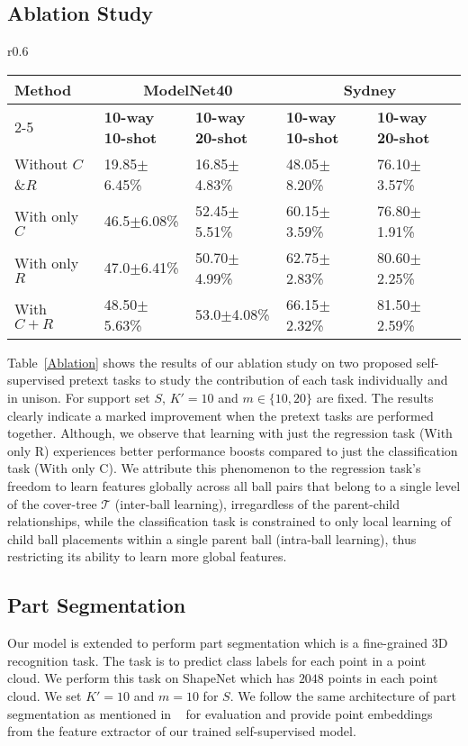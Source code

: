 \documentclass{article}
\newcommand{\mT}{\mathcal{T}}
\begin{document}
\subsection{Ablation Study}
\begin{wraptable}{r}{0.6\linewidth}
	\caption{Ablation study (accuracy \%) on ModelNet40 and Sydney datasets for DGCNN with random init (without $C$/ $R$) and pre-trained with our self-supervised tasks $C$ and $R$.}
	\label{Ablation}
	\centering
	\tiny
	\setlength{\tabcolsep}{4.5pt}
	\begin{tabular}{lllll}
		\toprule
		Method & \multicolumn{2}{c}{ModelNet40}  &  \multicolumn{2}{c}{Sydney}\\
		\cmidrule(r){2-5}
		& \textbf{10-way 10-shot} & \textbf{10-way 20-shot}  & \textbf{10-way 10-shot} & \textbf{10-way 20-shot}\\
		\midrule
		
Without $C$\&$R$ & 19.85$\pm$6.45\% & 16.85$\pm$4.83\% & 48.05$\pm$8.20\%  & 76.10$\pm$3.57\% \\
		With only $C$ & 46.5$\pm$6.08\% & 52.45$\pm$5.51\% &  60.15$\pm$3.59\% & 76.80$\pm$1.91\%\\
		With only $R$ & 47.0$\pm$6.41\% & 50.70$\pm$4.99\% & 62.75$\pm$2.83\% & 80.60$\pm$2.25\%\\
		With $C+R$& 48.50$\pm$5.63\% & 53.0$\pm$4.08\% & 66.15$\pm$2.32\% & 81.50$\pm$2.59\%\\
		\bottomrule
	\end{tabular}
\end{wraptable}
Table~\ref{Ablation} shows the results of our ablation study on two proposed self-supervised pretext tasks to study the contribution of each task individually and in unison. 
For support set $S$, $K'=10$ and $m \in \{10,20\}$ are fixed. 
The results clearly indicate a marked improvement when the pretext tasks are performed together. 
Although, we observe that learning with just the regression task (With only R) experiences better performance boosts compared to just the classification task (With only C). We attribute this phenomenon to the regression task's freedom to learn features globally across all ball pairs that belong to a single level of the cover-tree $\mT$ (inter-ball learning), irregardless of the parent-child relationships, while the classification task is constrained to only local learning of child ball placements within a single parent ball (intra-ball learning), thus restricting its ability to learn more global features.

\subsection{Part Segmentation}
Our model is extended to perform part segmentation which is a fine-grained 3D recognition task. The task is to predict class labels for each point in a point cloud. We perform this task on ShapeNet which has $2048$ points in each point cloud. We set $K'=10$ and $m=10$ for $S$. We follow the same architecture of part segmentation as mentioned in ~\cite{dgcnn} for evaluation and provide point embeddings from the feature extractor of our trained self-supervised model.
\end{document}
